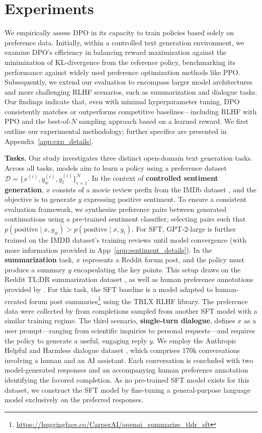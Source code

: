 \section{Experiments}
We empirically assess DPO in its capacity to train policies based solely on preference data. Initially, within a controlled text generation environment, we examine DPO's efficiency in balancing reward maximization against the minimization of KL-divergence from the reference policy, benchmarking its performance against widely used preference optimization methods like PPO. Subsequently, we extend our evaluation to encompass larger model architectures and more challenging RLHF scenarios, such as summarization and dialogue tasks. Our findings indicate that, even with minimal hyperparameter tuning, DPO consistently matches or outperforms competitive baselines—including RLHF with PPO and the best-of-$N$ sampling approach based on a learned reward. We first outline our experimental methodology; further specifics are presented in Appendix~\ref{app:exp_details}.

\textbf{Tasks.} Our study investigates three distinct open-domain text generation tasks. Across all tasks, models aim to learn a policy using a preference dataset $\mathcal{D}=\bigl\{x^{(i)}, y_w^{(i)}, y_l^{(i)}\bigr\}_{i=1}^N$. In the context of \textbf{controlled sentiment generation}, $x$ consists of a movie review prefix from the IMDb dataset \cite{maas-EtAl:2011:ACL-HLT2011}, and the objective is to generate $y$ expressing positive sentiment. To ensure a consistent evaluation framework, we synthesize preference pairs between generated continuations using a pre-trained sentiment classifier, selecting pairs such that $p(\text{positive}\mid x,y_w)>p(\text{positive}\mid x,y_l)$. For SFT, GPT-2-large is further trained on the IMDB dataset's training reviews until model convergence (with more information provided in App~\ref{app:sentiment_details}). In the \textbf{summarization} task, $x$ represents a Reddit forum post, and the policy must produce a summary $y$ encapsulating the key points. This setup draws on the Reddit TL;DR summarization dataset \citep{volske-etal-2017-tl}, as well as human preference annotations provided by \citeauthor{stiennon2022learning}. For this task, the SFT baseline is a model adapted to human-created forum post summaries\footnote{\url{https://huggingface.co/CarperAI/openai_summarize_tldr_sft}} using the TRLX \citep{leandro_von_werra_2023_7790115} RLHF library. The preference data were collected by \citeauthor{stiennon2022learning} from completions sampled from another SFT model with a similar training regime. The third scenario, \textbf{single-turn dialogue}, defines $x$ as a user prompt—ranging from scientific inquiries to personal requests—and requires the policy to generate a useful, engaging reply $y$. We employ the Anthropic Helpful and Harmless dialogue dataset \citep{bai2022training}, which comprises 170k conversations involving a human and an AI assistant. Each conversation is concluded with two model-generated responses and an accompanying human preference annotation identifying the favored completion. As no pre-trained SFT model exists for this dataset, we construct the SFT model by fine-tuning a general-purpose language model exclusively on the preferred responses.

